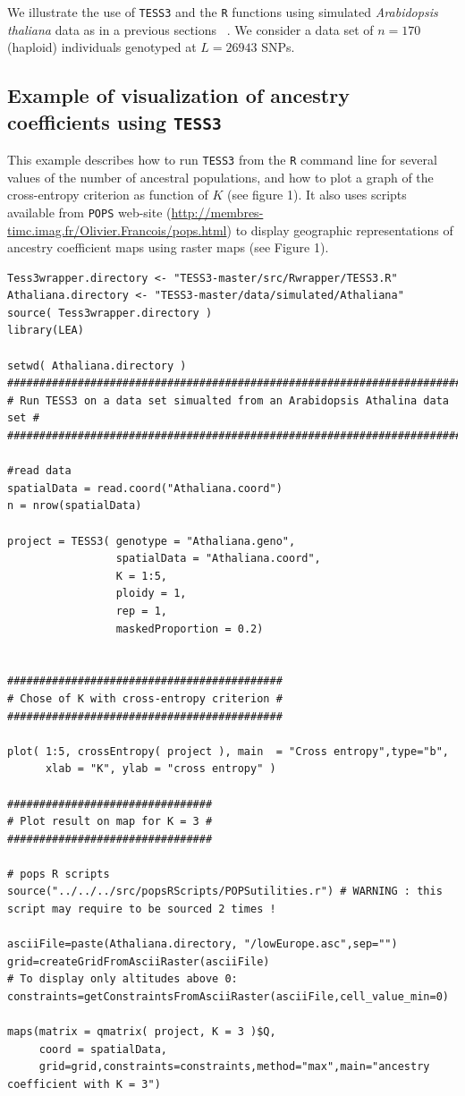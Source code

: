 \documentclass[10pt,a4paper]{article}
\begin{document}
We illustrate the use of {\tt TESS3} and the {\tt R} functions using simulated {\it Arabidopsis thaliana} data as in a previous sections ~\cite{atwell2010genome}. We consider a data set of $n = 170$ (haploid) individuals genotyped at $L = 26943$ SNPs.

\subsection{Example of visualization of ancestry coefficients using {\tt TESS3}}

This example describes how to run {\tt TESS3} from the {\tt R} command line for several values of the number of ancestral populations, and how to plot a graph of the cross-entropy criterion as function of $K$ (see figure 1). It also uses scripts available from {\tt POPS} web-site (\url{http://membres-timc.imag.fr/Olivier.Francois/pops.html}) to display geographic representations of ancestry coefficient maps using raster maps \cite{jay2012forecasting} (see Figure 1). 

\begin{Verbatim}[frame=single]
Tess3wrapper.directory <- "TESS3-master/src/Rwrapper/TESS3.R"
Athaliana.directory <- "TESS3-master/data/simulated/Athaliana"
source( Tess3wrapper.directory )
library(LEA)

setwd( Athaliana.directory )
###########################################################################
# Run TESS3 on a data set simualted from an Arabidopsis Athalina data set #
###########################################################################

#read data
spatialData = read.coord("Athaliana.coord")
n = nrow(spatialData)

project = TESS3( genotype = "Athaliana.geno", 
                 spatialData = "Athaliana.coord", 
                 K = 1:5, 
                 ploidy = 1, 
                 rep = 1, 
                 maskedProportion = 0.2)


###########################################
# Chose of K with cross-entropy criterion #
###########################################

plot( 1:5, crossEntropy( project ), main  = "Cross entropy",type="b", 
      xlab = "K", ylab = "cross entropy" )

################################
# Plot result on map for K = 3 #
################################

# pops R scripts
source("../../../src/popsRScripts/POPSutilities.r") # WARNING : this 
script may require to be sourced 2 times !

asciiFile=paste(Athaliana.directory, "/lowEurope.asc",sep="")
grid=createGridFromAsciiRaster(asciiFile)
# To display only altitudes above 0:
constraints=getConstraintsFromAsciiRaster(asciiFile,cell_value_min=0)

maps(matrix = qmatrix( project, K = 3 )$Q,
     coord = spatialData,
     grid=grid,constraints=constraints,method="max",main="ancestry coefficient with K = 3")
\end{Verbatim}
\end{document}
